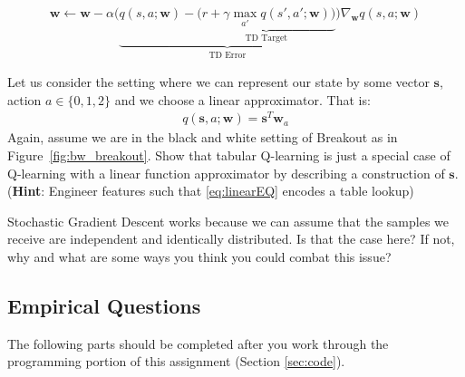\documentclass[11pt,addpoints,answers]{exam}
\newcommand{\sv}{\mathbf{s}}
\newcommand{\wv}{\mathbf{w}}
\begin{document}
\begin{questions}
    \begin{align}
    \wv \leftarrow \wv - \alpha \bigg( \underbrace{q(s, a; \wv) - \underbrace{\big (r + \gamma \max_{a'}q(s', a'; \wv)\big)}_{\text{TD Target}}}_{\text{TD Error}} \bigg) \nabla_\wv q(s, a; \wv)
    \end{align}
    
    \question[2] Let us consider the setting where we can represent our state by some vector $\sv$, action $a \in \{0, 1, 2\}$ and we choose a linear approximator. That is:
    \begin{align}
    \label{eq:linearEQ}
    q(\sv, a; \wv) = \sv^T\wv_a
    \end{align}
    Again, assume we are in the black and white setting of Breakout as in Figure~\ref{fig:bw_breakout}. Show that tabular Q-learning is just a special case of Q-learning with a linear function approximator by describing a construction of $\sv$. (\textbf{Hint}: Engineer features such that \ref{eq:linearEQ} encodes a table lookup)
    
    \begin{your_solution}[title=Answer,height=6cm,width=15cm]
    \end{your_solution}
    
    
    \question[3] Stochastic Gradient Descent works because we can assume that the samples we receive are independent and identically distributed. Is that the case here? If not, why and what are some ways you think you could combat this issue?
    
    \begin{your_solution}[title=Answer,height=4cm,width=15cm]
    \end{your_solution}
\end{questions}


\clearpage

\subsection{Empirical Questions}

The following parts should be completed after you work through the programming portion of this assignment (Section \ref{sec:code}). 
\end{document}
